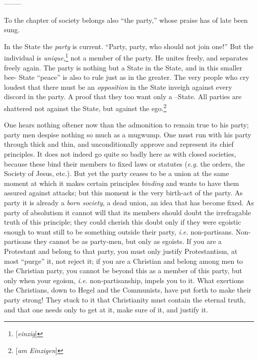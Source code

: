 \begin{center}
--------\end{center}


To the chapter of society belongs also ``the party,'' whose praise has of 
late been sung.

In the State the \textit{party} is current. ``Party, party, who should not 
join one!'' But the individual is 
\textit{unique},\footnote{[\textit{einzig}]} not a member of the party. He 
unites freely, and separates freely again. The party is nothing but a State in 
the State, and in this smaller bee- State ``peace'' is also to rule just as 
in the greater. The very people who cry loudest that there must be an 
\textit{opposition} in the State inveigh against every discord in the party. A 
proof that they too want only a --State. All parties are shattered not against 
the State, but against the ego.\footnote{[\textit{am Einzigen}]}

One hears nothing oftener now than the admonition to remain true to his party; 
party men despise nothing so much as a mugwump. One must run with his party 
through thick and thin, and unconditionally approve and represent its chief 
principles. It does not indeed go quite so badly here as with closed 
societies, because these bind their members to fixed laws or statutes 
(\textit{e.g.} the orders, the Society of Jesus, etc.). But yet the party 
ceases to be a union at the same moment at which it makes certain principles 
\textit{binding} and wants to have them assured against attacks; but this 
moment is the very birth-act of the party. As party it is already a 
\textit{born society}, a dead union, an idea that has become fixed. As party 
of absolutism it cannot will that its members should doubt the irrefragable 
truth of this principle; they could cherish this doubt only if they were 
egoistic enough to want still to be something outside their party, 
\textit{i.e.} non-partisans. Non-partisans they cannot be as party-men, but 
only as egoists. If you are a Protestant and belong to that party, you must 
only justify Protestantism, at most ``purge'' it, not reject it; if you are 
a Christian and belong among men to the Christian party, you cannot be beyond 
this as a member of this party, but only when your egoism, \textit{i.e.} 
non-partisanship, impels you to it. What exertions the Christians, down to 
Hegel and the Communists, have put forth to make their party strong! They 
stuck to it that Christianity must contain the eternal truth, and that one 
needs only to get at it, make sure of it, and justify it.

